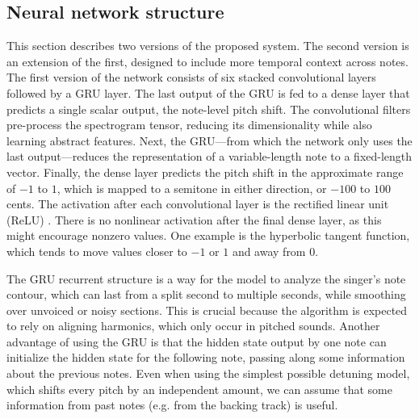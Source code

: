 \subsection{Neural network structure}
This section describes two versions of the proposed system. The second version is an extension of the first, designed to include more temporal context across notes. The first version of the network consists of six stacked convolutional layers followed by a GRU layer. The last output of the GRU is fed to a dense layer that predicts a single scalar output, the note-level pitch shift. The convolutional filters pre-process the spectrogram tensor, reducing its dimensionality while also learning abstract features. Next, the GRU---from which the network only uses the last output---reduces the representation of a variable-length note to a fixed-length vector. Finally, the dense layer predicts the pitch shift in the approximate range of $-1$ to $1$, which is mapped to a semitone in either direction, or $-100$ to $100$ cents. The activation after each convolutional layer is the rectified linear unit (ReLU) \cite{he2015delving}. There is no nonlinear activation after the final dense layer, as this might encourage nonzero values. One example is the hyperbolic tangent function, which tends to move values closer to $-1$ or $1$ and away from 0. 

The GRU recurrent structure is a way for the model to analyze the singer's note contour, which can last from a split second to multiple seconds, while smoothing over unvoiced or noisy sections. This is crucial because the algorithm is expected to rely on aligning harmonics, which only occur in pitched sounds. Another advantage of using the GRU is that the hidden state output by one note can initialize the hidden state for the following note, passing along some information about the previous notes. Even when using the simplest possible detuning model, which shifts every pitch by an independent amount, we can assume that some information from past notes (e.g. from the backing track) is useful.

